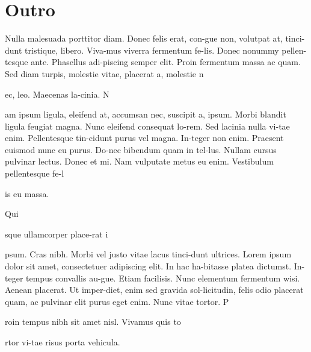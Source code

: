 \documentclass[bleed=3mm,grid,graphpaper]{pagelayout}
\begin{document}
{{      \section*{Outro}
      Nulla malesuada porttitor diam. Donec felis erat, con-gue non, volutpat at, tinci-dunt tristique, libero. Viva-mus viverra fermentum fe-lis. Donec nonummy pellen-tesque ante. Phasellus adi-piscing semper elit. Proin fermentum massa ac quam. Sed diam turpis, molestie vitae, placerat a, molestie n\strut ec, leo. Maecenas la-cinia. N\strut am ipsum ligula, eleifend at, accumsan nec, suscipit a, ipsum. Morbi blandit ligula feugiat magna. Nunc eleifend consequat lo-rem. Sed lacinia nulla vi-tae enim. Pellentesque tin-cidunt purus vel magna. In-teger non enim. Praesent euismod nunc eu purus. Do-nec bibendum quam in tel-lus. Nullam cursus pulvinar lectus. Donec et mi. Nam vulputate metus eu enim. Vestibulum pellentesque fe-l\strut is eu massa.
      \par
Qui\strut sque ullamcorper place-rat i\strut psum. Cras nibh. Morbi vel justo vitae lacus tinci-dunt ultrices. Lorem ipsum dolor sit amet, consectetuer adipiscing elit. In hac ha-bitasse platea dictumst. In-teger tempus convallis au-gue. Etiam facilisis. Nunc elementum fermentum wisi. Aenean placerat. Ut imper-diet, enim sed gravida sol-licitudin, felis odio placerat quam, ac pulvinar elit purus eget enim. Nunc vitae tortor. P\strut roin tempus nibh sit amet nisl. Vivamus quis to\strut rtor vi-tae risus porta vehicula.
    }
    \usetext[fix]
  }

\end{document}
